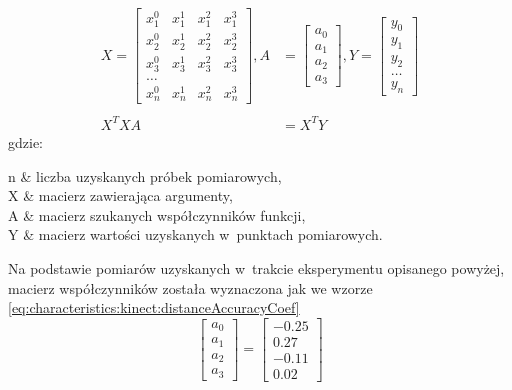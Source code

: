 \begin{equation}
	\begin{split}
		X = 	\begin{bmatrix}
		x_1^0&x_1^1&x_1^2&x_1^3\\
		x_2^0&x_2^1&x_2^2&x_2^3\\
		x_3^0&x_3^1&x_3^2&x_3^3\\
		\dots\\
		x_n^0&x_n^1&x_n^2&x_n^3
		\end{bmatrix} ,
		A &= 	\begin{bmatrix}
		a_0\\a_1\\a_2\\a_3
		\end{bmatrix} ,
		Y = 
		\begin{bmatrix}
			y_0 \\y_1\\y_2\\\dots\\y_n
		\end{bmatrix} \\
		& \\
		X^TXA &= X^TY
	\end{split}
	\label{eq:characteristics:kinect:distanceAccuracyPoly}
\end{equation}
gdzie:
\begin{conditions}
	n			& liczba uzyskanych próbek pomiarowych,																\\
	X			& macierz zawierająca argumenty,																\\
	A			& macierz szukanych współczynników funkcji,																\\
	Y			& macierz wartości uzyskanych w~punktach pomiarowych.																\\
\end{conditions}
		
		
Na podstawie pomiarów uzyskanych w~trakcie eksperymentu opisanego powyżej, macierz współczynników została wyznaczona jak we wzorze \eqref{eq:characteristics:kinect:distanceAccuracyCoef}
\begin{equation}
	\label{eq:characteristics:kinect:distanceAccuracyCoef}
	\begin{bmatrix}
		a_0 \\a_1\\a_2\\a_3
	\end{bmatrix} = 
	\begin{bmatrix}
		- 0.25 \\  0.27 \\- 0.11\\0.02		
	\end{bmatrix}	
\end{equation}
		


